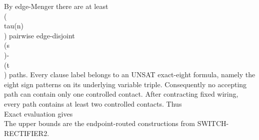 By edge-Menger there are at least \\(\\tau(n)\\) pairwise edge-disjoint \\(s\\)-\\(t\\) paths.
Every clause label belongs to an UNSAT exact-eight formula, namely the eight sign patterns on
its underlying variable triple. Consequently no accepting path can contain only one controlled
contact. After contracting fixed wiring, every path contains at least two controlled contacts.
Thus
\\[ \\boxed{C_{\\rm passive}(n,8)\\ge2\\tau(n).} \\]

Exact evaluation gives
\\[42\\le C_{\\rm passive}(4,8)\\le48,\\qquad
132\\le C_{\\rm passive}(5,8)\\le144.\\]
The upper bounds are the endpoint-routed constructions from SWITCH-RECTIFIER2.

